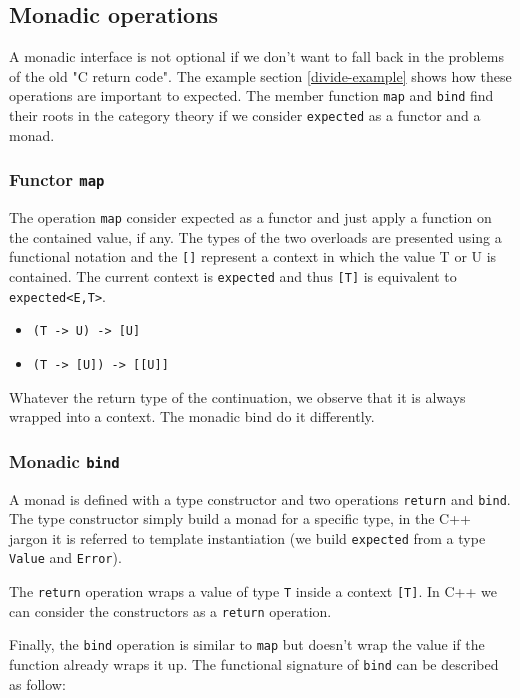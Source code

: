 \documentclass[a4paper,10pt]{article}
\newcommand{\cpp}[1]{\lstinline{#1}}
\begin{document}
\subsection{Monadic operations}
\label{monadic-operations}

A monadic interface is not optional if we don't want to fall back in the problems of the old "C return code". The example section \ref{divide-example} shows how these operations are important to expected. The member function \cpp{map} and \cpp{bind} find their roots in the category theory if we consider \cpp{expected} as a functor and a monad.

\subsubsection{Functor \cpp{map}}

The operation \cpp{map} consider expected as a functor and just apply a function on the contained value, if any. The types of the two overloads are presented using a functional notation and the \cpp{[]} represent a context in which the value T or U is contained. The current context is \cpp{expected} and thus \cpp{[T]} is equivalent to \cpp{expected<E,T>}.

\begin{itemize}
\item \cpp{(T -> U) -> [U]}
\item \cpp{(T -> [U]) -> [[U]]}
\end{itemize}

Whatever the return type of the continuation, we observe that it is always wrapped into a context. The monadic bind do it differently.

\subsubsection{Monadic \cpp{bind}}

A monad is defined with a type constructor and two operations \cpp{return} and \cpp{bind}. The type constructor simply build a monad for a specific type, in the C++ jargon it is referred to template instantiation (we build \cpp{expected} from a type \cpp{Value} and \cpp{Error}).

The \cpp{return} operation wraps a value of type \cpp{T} inside a context \cpp{[T]}. In C++ we can consider the constructors as a \cpp{return} operation.

Finally, the \cpp{bind} operation is similar to \cpp{map} but doesn't wrap the value if the function already wraps it up. The functional signature of \cpp{bind} can be described as follow:
\end{document}
